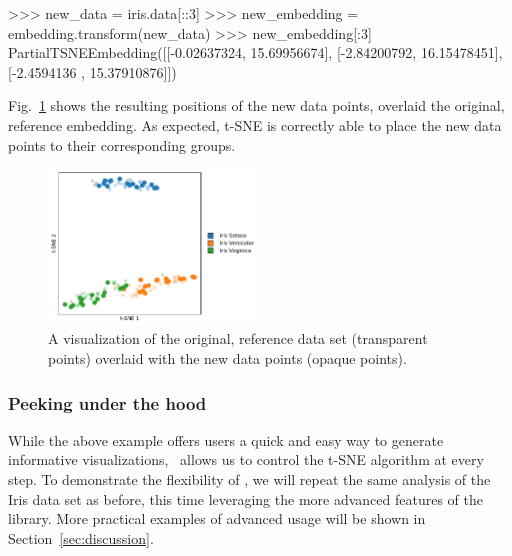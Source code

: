 \documentclass[article]{jss}
\newcommand{\opentsne}{\pkg{openTSNE}}
\begin{document}
\begin{CodeChunk}
\begin{CodeInput}
>>> new_data = iris.data[::3]
>>> new_embedding = embedding.transform(new_data)
>>> new_embedding[:3]
PartialTSNEEmbedding([[-0.02637324, 15.69956674],
                      [-2.84200792, 16.15478451],
                      [-2.4594136 , 15.37910876]])
\end{CodeInput}
\end{CodeChunk}
Fig.~\ref{fig:iris-transform} shows the resulting positions of the new data points, overlaid the original, reference embedding. As expected, t-SNE is correctly able to place the new data points to their corresponding groups.
\begin{figure}[htbp]
  \centering
  \includegraphics[width=0.5\textwidth]{iris-transform}
  \caption{\label{fig:iris-transform}
  A visualization of the original, reference data set (transparent points) overlaid with the new data points (opaque points).
}
\end{figure}


\subsubsection{Peeking under the hood}

While the above example offers users a quick and easy way to generate informative visualizations, \opentsne\ allows us to control the t-SNE algorithm at every step. To demonstrate the flexibility of \opentsne, we will repeat the same analysis of the Iris data set as before, this time leveraging the more advanced features of the library. More practical examples of advanced usage will be shown in Section~\ref{sec:discussion}.
\end{document}
